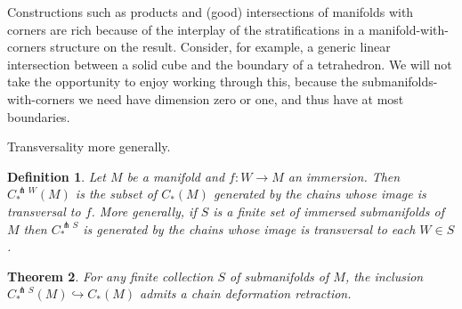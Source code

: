 \documentclass{amsart}          %
\newtheorem{theorem}{Theorem}
\newtheorem{definition}[theorem]{Definition}
\begin{document}
Constructions such as products and (good) intersections of manifolds with corners are rich because of the interplay of the stratifications in 
a manifold-with-corners structure on the result.  Consider, for example, a generic linear intersection between a solid cube and the 
boundary of a tetrahedron.
We will not take the opportunity to enjoy working through this, because the submanifolds-with-corners we need have dimension
zero or one, and thus have at most boundaries.


Transversality more generally.

\begin{definition}
Let $M$ be a manifold and $f : W \to M$ an immersion. Then $C^{\pitchfork W}_{*}(M)$ is the subset of $C_{*}(M)$ generated by the chains whose image is transversal to $f$. More generally, if $S$ is a  finite set of immersed submanifolds of $M$ then $C^{\pitchfork S}_{*}$ is generated by the chains whose image is transversal to each $W \in S$.
\end{definition}

\begin{theorem}\label{T:qi}
For any finite collection $S$ of submanifolds of $M$, the inclusion $C^{\pitchfork S}_{*}(M) \hookrightarrow C_{*}(M)$ admits a chain deformation retraction.
\end{theorem}
\end{document}
